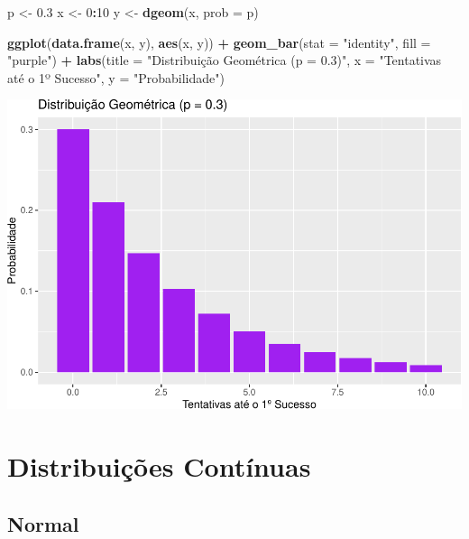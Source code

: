 \documentclass[
]{book}
\newenvironment{Shaded}{\begin{snugshade}}{\end{snugshade}}
\newcommand{\AttributeTok}[1]{\textcolor[rgb]{0.13,0.29,0.53}{#1}}
\newcommand{\DecValTok}[1]{\textcolor[rgb]{0.00,0.00,0.81}{#1}}
\newcommand{\FloatTok}[1]{\textcolor[rgb]{0.00,0.00,0.81}{#1}}
\newcommand{\FunctionTok}[1]{\textcolor[rgb]{0.13,0.29,0.53}{\textbf{#1}}}
\newcommand{\NormalTok}[1]{#1}
\newcommand{\OtherTok}[1]{\textcolor[rgb]{0.56,0.35,0.01}{#1}}
\newcommand{\SpecialCharTok}[1]{\textcolor[rgb]{0.81,0.36,0.00}{\textbf{#1}}}
\newcommand{\StringTok}[1]{\textcolor[rgb]{0.31,0.60,0.02}{#1}}
\begin{document}
\begin{Shaded}
\begin{Highlighting}[]
\NormalTok{p }\OtherTok{\textless{}{-}} \FloatTok{0.3}
\NormalTok{x }\OtherTok{\textless{}{-}} \DecValTok{0}\SpecialCharTok{:}\DecValTok{10}
\NormalTok{y }\OtherTok{\textless{}{-}} \FunctionTok{dgeom}\NormalTok{(x, }\AttributeTok{prob =}\NormalTok{ p)}

\FunctionTok{ggplot}\NormalTok{(}\FunctionTok{data.frame}\NormalTok{(x, y), }\FunctionTok{aes}\NormalTok{(x, y)) }\SpecialCharTok{+}
  \FunctionTok{geom\_bar}\NormalTok{(}\AttributeTok{stat =} \StringTok{"identity"}\NormalTok{, }\AttributeTok{fill =} \StringTok{"purple"}\NormalTok{) }\SpecialCharTok{+}
  \FunctionTok{labs}\NormalTok{(}\AttributeTok{title =} \StringTok{"Distribuição Geométrica (p = 0.3)"}\NormalTok{, }\AttributeTok{x =} \StringTok{"Tentativas até o 1º Sucesso"}\NormalTok{, }\AttributeTok{y =} \StringTok{"Probabilidade"}\NormalTok{)}
\end{Highlighting}
\end{Shaded}

\includegraphics{LivroEstatisticaR_files/figure-latex/geometricaDist-1.pdf}

\section{Distribuições Contínuas}\label{distribuiuxe7uxf5es-contuxednuas}

\subsection{Normal}\label{normal}
\end{document}
